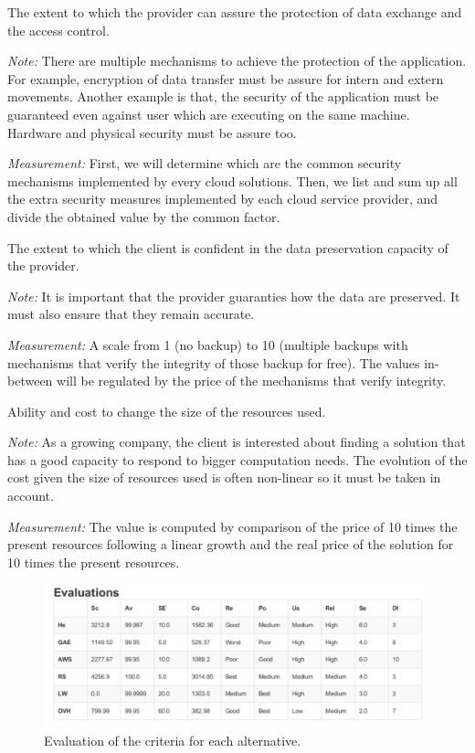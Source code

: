 \documentclass[a4paper,11pt]{article}
\begin{document}
\begin{description}[parsep=10pt,listparindent=\parindent,labelindent=\parindent,font=$\bullet$\ ]
  \item[Security:] The extent to which the provider can assure the protection of data exchange and the access control.
    \par \emph{Note:} There are multiple mechanisms to achieve the protection of the application. For example, encryption of data transfer must be assure for intern and extern movements. Another example is that, the security of the application must be guaranteed even against user which are executing on the same machine. Hardware and physical security must be assure too. 
    \par \emph{Measurement:} First, we will determine which are the common security mechanisms implemented by every cloud solutions. Then, we list and sum up all the extra security measures implemented by each cloud service provider, and divide the obtained value by the common factor.

  \item[Data Integrity:] The extent to which the client is confident in the data preservation capacity of the provider.
    \par \emph{Note:} It is important that the provider guaranties how the data are preserved. It must also ensure that they remain accurate.
    \par \emph{Measurement:} A scale from 1 (no backup) to 10 (multiple backups with mechanisms that verify the integrity of those backup for free). The values in-between will be regulated by the price of the mechanisms that verify integrity.

  \item[Scalability:] Ability and cost to change the size of the resources used.
    \par \emph{Note:} As a growing company, the client is interested about finding a solution that has a good capacity to respond to bigger computation needs. The evolution of the cost given the size of resources used is often non-linear so it must be taken in account.
    \par \emph{Measurement:} The value is computed by comparison of the price of 10 times the present resources following a linear growth and the real price of the solution for 10 times the present resources.

\end{description}

\begin{figure}[h]
  \center
  \includegraphics[width=\textwidth-2cm]{img/Result/evaluation.pdf}
  \caption{Evaluation of the criteria for each alternative.}
  \label{fig:eval}
\end{figure}
\end{document}
